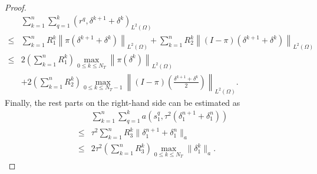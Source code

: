 \documentclass[preprint,12pt]{elsarticle}
\begin{document}
\begin{proof}
\begin{equation}
\begin{aligned}
     &\sum_{k=1}^n\sum_{q=1}^k\left(r^q,\delta^{k+1}+\delta^{k}\right)_{L^2(\Omega)}\\
     \leq&\sum_{k=1}^nR_1^k\left\|\pi(\delta^{k+1}+\delta^{k})\right\|_{L^2(\Omega)}+\sum_{k=1}^nR_2^k\left\|(I-\pi)(\delta^{k+1}+\delta^{k})\right\|_{L^2(\Omega)}\\
     \leq&2\left(\sum_{k=1}^nR_1^k\right)\max_{0\leq k\leq N_T}\left\|\pi(\delta^k)\right\|_{L^2(\Omega)}\\
     &+2\left(\sum_{k=1}^nR_2^k\right)\max_{0\leq k\leq N_{T}-1}\left\|(I-\pi)\left(\frac{\delta^{k+1}+\delta^{k}}{2}\right)\right\|_{L^2(\Omega)}.
\end{aligned}
\end{equation}
Finally, the rest parts on the right-hand side can be estimated as
\begin{equation}\label{2.17}
\begin{aligned}
&\sum_{k=1}^n\sum_{q=1}^ka\left(s_1^q,\tau^2(\delta_1^{n+1}+\delta_1^{n})\right)\\
\leq&\tau^2\sum_{k=1}^nR_3^k\|\delta_1^{n+1}+\delta_1^{n}\|_a\\
\leq&2\tau^2\left(\sum_{k=1}^nR_3^k\right)\max_{0\leq k\leq N_T}\|\delta_1^{k}\|_a.
\end{aligned}
\end{equation}


\end{proof}
\end{document}
